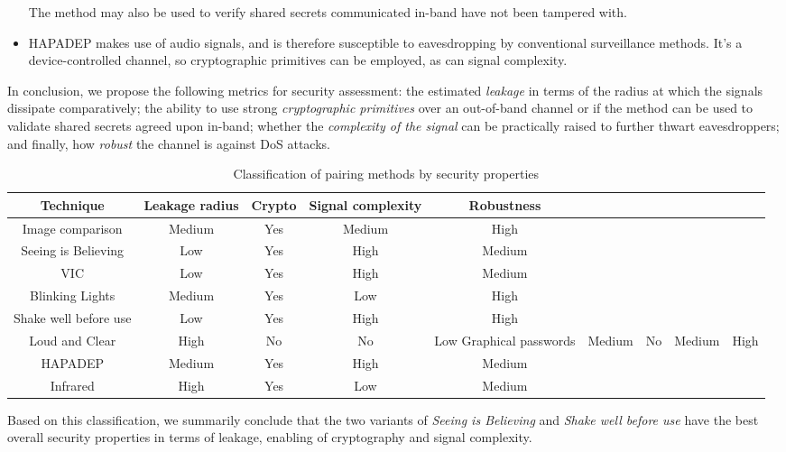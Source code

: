 \documentclass[conference, 11pt]{sty/IEEEtran}
\begin{document}
\begin{itemize}
	The method may also be used to verify shared secrets communicated in-band have not been tampered with.
	\item HAPADEP makes use of audio signals, and is therefore susceptible to eavesdropping by conventional surveillance methods. It's a device-controlled channel, so cryptographic primitives can be employed, as can signal complexity.
\end{itemize}

In conclusion, we propose the following metrics for security assessment: the estimated \emph{leakage} in terms of the radius at which the signals dissipate comparatively; the ability to use strong \emph{cryptographic primitives} over an out-of-band channel or if the method can be used to validate shared secrets agreed upon in-band; whether the \emph{complexity of the signal} can be practically raised to further thwart eavesdroppers; and finally, how \emph{robust} the channel is against DoS attacks.

\hspace{-2em}
\begin{table}[t]
    \centering
    \normalsize{
\begin{tabular}{c|c|c|c|c}
	Technique & Leakage radius & Crypto & Signal complexity & Robustness \\
	\hline
	Image comparison & Medium & Yes & Medium & High\\
     Seeing is Believing & Low & Yes & High & Medium \\
		     VIC & Low & Yes & High & Medium\\
	 Blinking Lights & Medium & Yes & Low & High\\
	Shake well before use & Low & Yes & High & High \\
	       Loud and Clear & High & No & No & Low
      Graphical passwords & Medium & No & Medium & High \\
		 HAPADEP & Medium & Yes & High & Medium \\
	  Infrared & High & Yes & Low & Medium \\
\end{tabular}
}
    \caption{Classification of pairing methods by security properties}
    \label{table:security_properties}
\end{table}
\hspace{2em}

Based on this classification, we summarily conclude that the two variants of \textit{Seeing is Believing} and \textit{Shake well before use} have the best overall security properties in terms of leakage, enabling of cryptography and signal complexity.
\end{document}
